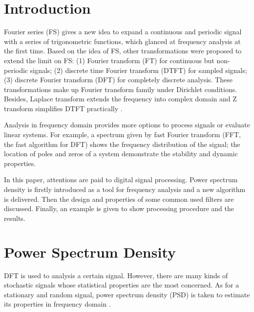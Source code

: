 \section{Introduction}


Fourier series (FS) gives a new idea to expand a continuous and periodic signal with a series of trigonometric functions, which glanced at frequency analysis at the first time. Based on the idea of FS, other transformations were proposed to extend the limit on FS: (1) Fourier transform (FT) for continuous but non-periodic signals; (2) discrete time Fourier transform (DTFT) for sampled signals; (3) discrete Fourier transform (DFT) for completely discrete analysis. These transformations make up Fourier transform family under Dirichlet conditions. Besides, Laplace transform extends the frequency into complex domain and Z transform simplifies DTFT practically \cite{SignalSystem}.


Analysis in frequency domain provides more options to process signals or evaluate linear systems. For example, a spectrum given by fast Fourier transform (FFT, the fast algorithm for DFT) shows the frequency distribution of the signal; the location of poles and zeros of a system demonstrate the stability and dynamic properties.


In this paper, attentions are paid to digital signal processing. Power spectrum density is firstly introduced as a tool for frequency analysis and a new algorithm is delivered. Then the design and properties of some common used filters are discussed. Finally, an example is given to show processing procedure and the results.




\section{Power Spectrum Density}


DFT is used to analysis a certain signal. However, there are many kinds of stochastic signals whose statistical properties are the most concerned. As for a stationary and random signal, power spectrum density (PSD) is taken to estimate its properties in frequency domain \cite{SignalDetect}.


